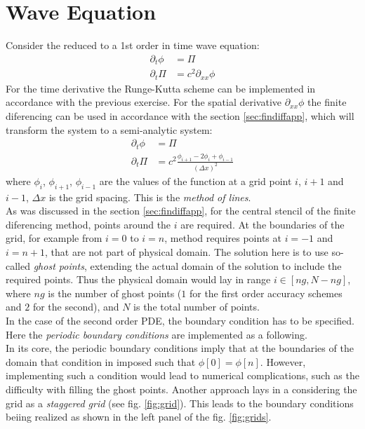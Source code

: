 \documentclass{article}
\begin{document}
\section{Wave Equation}
Consider the reduced to a 1st order in time wave equation:
\begin{equation}
\begin{aligned}
\partial_t\phi &= \Pi \\
\partial_t\Pi &= c^2\partial_{xx}\phi
\end{aligned}
\end{equation}
For the time derivative the Runge-Kutta scheme can be implemented in accordance with the previous exercise. For the spatial derivative $\partial_{xx}\phi$ the finite diferencing can be used in accordance with the section \ref{sec:findiffapp}, which will transform the system to a semi-analytic system:
\begin{equation}
\begin{aligned}
\partial_t\phi &= \Pi \\
\partial_t\Pi &= c^2 \frac{\phi_{i+1} - 2\phi_i +  \phi_{i-1}}{(\Delta x)^2}
\end{aligned}
\end{equation}
where $\phi_{i}$, $\phi_{i+1}$, $\phi_{i-1}$ are the values of the function at a grid point $i$, $i+1$ and $i-1$, $\Delta x$ is the grid spacing. This is the \textit{method of lines}. \\
%
As was discussed in the section \ref{sec:findiffapp}, for the central stencil of the finite diferencing method, points around the $i$ are required. At the boundaries of the grid, for example from $i=0$ to $i=n$, method requires points at $i=-1$ and $i=n+1$, that are not part of physical domain. The solution here is to use so-called \textit{ghost points}, extending the actual domain of the solution to include the required points. Thus the physical domain would lay in range $i\in[ng, N-ng]$, where $ng$ is the number of ghost points ($1$ for the first order accuracy schemes and $2$ for the second), and $N$ is the total number of points. \\
In the case of the second order PDE, the boundary condition has to be specified. Here the \textit{periodic boundary conditions} are implemented as a following. \\
In its core, the periodic boundary conditions imply that at the boundaries of the domain that condition in imposed such that $\phi[0]=\phi[n]$. However, implementing such a condition would lead to numerical complications, such as the difficulty with filling the ghost points. Another approach lays in a considering the grid as a \textit{staggered grid} (see fig. \ref{fig:grid}). This leads to the boundary conditions beiing realized as shown in the left panel of the fig. \ref{fig:grids}.
\end{document}
